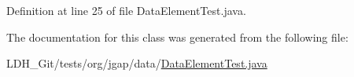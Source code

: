 Definition at line 25 of file Data\-Element\-Test.\-java.



The documentation for this class was generated from the following file\-:\begin{DoxyCompactItemize}
\item 
L\-D\-H\-\_\-\-Git/tests/org/jgap/data/\hyperlink{_data_element_test_8java}{Data\-Element\-Test.\-java}\end{DoxyCompactItemize}
